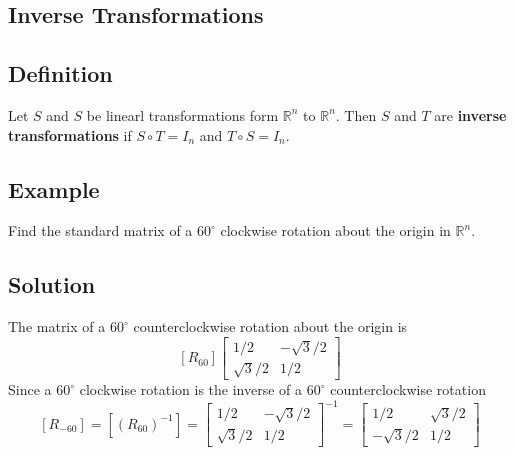 \subsection*{Inverse Transformations}

\subsection*{Definition}
Let $S$ and $S$ be linearl transformations form $\mathbb{R}^n$ to $\mathbb{R}^n$.
Then $S$ and $T$ are \textbf{inverse transformations} if $S\circ T=I_n$ and $T\circ S=I_n$.

\subsection*{Example}
Find the standard matrix of a $60^\circ$ clockwise rotation about the origin in $\mathbb{R}^n$.

\subsection*{Solution}
The matrix of a $60^\circ$ counterclockwise rotation about the origin is
\[
    [R_{60}]\begin{bmatrix}
        1/2        & -\sqrt{3}/2 \\
        \sqrt{3}/2 & 1/2
    \end{bmatrix}
\]
Since a $60^\circ$ clockwise rotation is the inverse of a $60^\circ$ counterclockwise rotation
\[
    [R_{-60}]=[(R_{60})^{-1}]=\begin{bmatrix}
        1/2        & -\sqrt{3}/2 \\
        \sqrt{3}/2 & 1/2
    \end{bmatrix}^{-1}=\begin{bmatrix}
        1/2         & \sqrt{3}/2 \\
        -\sqrt{3}/2 & 1/2
    \end{bmatrix}
\]